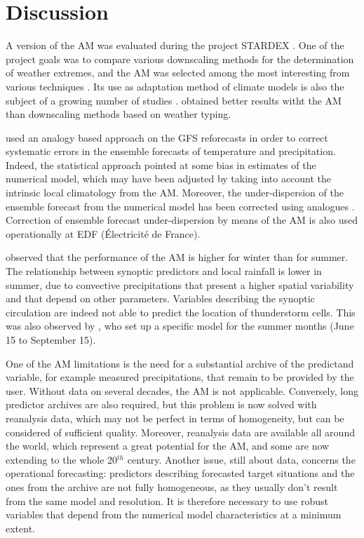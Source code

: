 \documentclass[review]{elsarticle}
\begin{document}
\section{Discussion}
\label{sec:discussion}


A version of the AM was evaluated during the project STARDEX \citep[\textit{STAtistical and Regional dynamical Downscaling of EXtremes for European regions}, see][]{Goodess2003, Stardex2005}. One of the project goals was to compare various downscaling methods for the determination of weather extremes, and the AM was selected among the most interesting from various techniques \citep{Maheras2005, Schmidli2007}. Its use as adaptation method of climate models is also the subject of a growing number of studies \citep{Zorita1999, Wetterhall2005, Wetterhall2007, Matulla2007, Chardon2014, Dayon2015}. \citet{Bliefernicht2010} obtained better results witht the AM than downscaling methods based on weather typing.

\citet{Hamill2006} used an analogy based approach on the GFS reforecasts in order to correct systematic errors in the ensemble forecasts of temperature and precipitation. Indeed, the statistical approach pointed at some bias in estimates of the numerical model, which may have been adjusted by taking into account the intrinsic local climatology from the AM. Moreover, the under-dispersion of the ensemble forecast from the numerical model has been corrected using analogues \citep{Hamill2006}. Correction of ensemble forecast under-dispersion by means of the AM is also used operationally at EDF (\'{E}lectricit\'{e} de France).

\citet{Bliefernicht2010} observed that the performance of the AM is higher for winter than for summer. The relationship between synoptic predictors and local rainfall is lower in summer, due to convective precipitations that present a higher spatial variability and that depend on other parameters. Variables describing the synoptic circulation are indeed not able to predict the location of thunderstorm cells. This was also observed by \citet{BenDaoud2010}, who set up a specific model for the summer months (June 15 to September 15).

One of the AM limitations is the need for a substantial archive of the predictand variable, for example measured precipitations, that remain to be provided by the user. Without data on several decades, the AM is not applicable. Conversely, long predictor archives are also required, but this problem is now solved with reanalysis data, which may not be perfect in terms of homogeneity, but can be considered of sufficient quality. Moreover,  reanalysis data are available all around the world, which represent a great potential for the AM, and some are now extending to the whole 20$^{th}$ century. Another issue, still about data, concerns the operational forecasting: predictors describing forecasted target situations and the ones from the archive are not fully homogeneous, as they usually don't result from the same model and resolution. It is therefore necessary to use robust variables that depend from the numerical model characteristics at a minimum extent.
\end{document}

